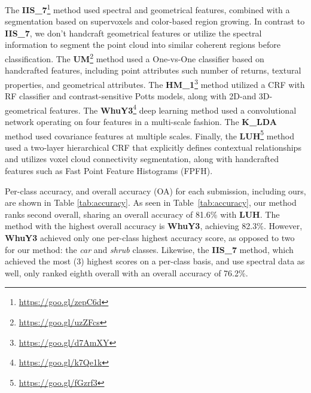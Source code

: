 \documentclass[final,3p,times,twocolumn,authoryear]{elsarticle}
\newcommand{\mxy}[1]{ \color{red}{#1}}
\begin{document}
The {\bf IIS\_7}\footnote{\url{https://goo.gl/zepC6d}}  method used spectral and geometrical features, combined with a segmentation based on supervoxels and color-based region growing. 
In contrast to {\bf IIS\_7}, we don't handcraft geometrical features or utilize the spectral information to segment the point cloud into similar coherent regions before classification. 
The {\bf UM}\footnote{\url{https://goo.gl/uzZFcs}} method used a One-vs-One classifier based on handcrafted features, including point attributes such number of returns, textural properties, and geometrical attributes. 
The {\bf HM\_1}\footnote{\url{https://goo.gl/d7AmXY}} method utilized a CRF with RF classifier and contrast-sensitive Potts models, along with 2D-and 3D-geometrical features. 
The {\bf WhuY3}\footnote{\url{https://goo.gl/k7Qe1k}} deep learning method used a convolutional network operating on four features in a multi-scale fashion. 
The {\bf K\_LDA}~\citep{Blomley16} method used covariance features at multiple scales. 
Finally, the {\bf LUH}\footnote{\url{https://goo.gl/fGzrf3}} method used a two-layer hierarchical CRF that explicitly defines contextual relationships and utilizes voxel cloud connectivity segmentation, along with handcrafted features such as Fast Point Feature Histograms (FPFH).%

Per-class accuracy, and overall accuracy (OA) for each submission, including ours, are shown in Table \ref{tab:accuracy}. 
As seen in Table~\ref{tab:accuracy}, our method ranks second overall, sharing an overall accuracy of 81.6\% with {\bf LUH}.
The method with the highest overall accuracy is {\bf WhuY3}, achieving 82.3\%. 
However, {\bf WhuY3} achieved only one per-class highest accuracy score, as opposed to two for our method: the {\it car} and {\it shrub} classes.  
Likewise, the {\bf IIS\_7} method, which achieved the most (3) highest scores on a per-class basis, and use spectral data as well, only ranked eighth overall with an overall accuracy of 76.2\%. 
\end{document}
